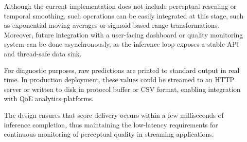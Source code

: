 Although the current implementation does not include perceptual rescaling or temporal smoothing, such operations can be easily integrated at this stage, such as exponential moving averages or sigmoid-based range transformations. Moreover, future integration with a user-facing dashboard or quality monitoring system can be done asynchronously, as the inference loop exposes a stable API and thread-safe data sink.

For diagnostic purposes, raw predictions are printed to standard output in real time. In production deployment, these values could be streamed to an HTTP server or written to disk in protocol buffer or CSV format, enabling integration with QoE analytics platforms.

The design ensures that score delivery occurs within a few milliseconds of inference completion, thus maintaining the low-latency requirements for continuous monitoring of perceptual quality in streaming applications.

